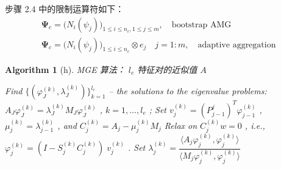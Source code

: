 \documentclass[12pt]{acta_2011xz}
\newcommand{\dof}{\ensuremath{N}}
\newtheorem{algorithm}[equation]{Algorithm}
\begin{document}
步骤 2.4 中的限制运算符如下：
   \begin{eqnarray*}
\bm\Psi_c=\bigg(\dof_i(\psi_j)\bigg)_{1\le i\le n_c, 1\le j\le m}, \quad \mbox{bootstrap AMG}
 \\ 
\bm\Psi_c=\bigg(\dof_i(\psi_j)\bigg)_{1\le i\le n_c}\otimes e_j\quad j=1:m, \quad\mbox{adaptive aggregation}
\end{eqnarray*}     

   \begin{algorithm}[h]   \caption{MGE 算法：   $l_e$    特征对的近似值    $A$       \label{a:MGE}     }    
   \begin{algorithmic}
         \State Find               $ \{ (\varphi_J^{(k)},\lambda_J^{(k)}) \} _{k=1}^{l_e}$              -- the solutions to the eigenvalue problems:
            \State                    $A_J\varphi_J^{(k)}=\lambda_J^{(k)}M_J\varphi_J^{(k)}$              ,               $k=1,\dots,l_e$              ; 
        \Else
            \State Set               $v_{j}^{(k)} = (P_{j-1}^{j})^T\varphi_{j-1}^{(k)}$              , 
                           $\mu_{j}^{(k)}=\lambda_{j-1}^{(k)}$              , and               $C_{j}^{(k)} = A_{j}-\mu_{j}^{(k)}M_{j}$              
           \State Relax on               $C_{j}^{(k)} w = 0$              , i.e.,               $\varphi_{j}^{(k)} = (I - S_{j}^{(k)}C_{j}^{(k)})\; v_{j}^{(k)}$              .
           \State Set               $\lambda_j^{(k)} = \dfrac{\langle A_{j}\varphi_{j}^{(k)},\varphi_j^{(k)}\rangle}{\langle M_j\varphi_j^{(k)},\varphi_j^{(k)}\rangle}$              
        \EndFor
      \EndIf
    \EndFor
  \end{algorithmic}     \end{algorithm}     
\end{document}
